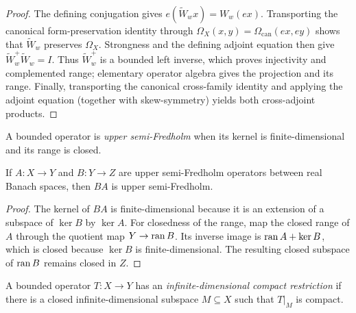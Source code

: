 \begin{proof}
The defining conjugation gives
$e(\widetilde W_wx)=W_w(ex)$.  Transporting the canonical form-preservation identity through
$\Omega_X(x,y)=\Omega_{\mathrm{can}}(ex,ey)$ shows that $\widetilde W_w$ preserves $\Omega_X$.
Strongness and the defining adjoint equation then give
$\widetilde W_w^+\widetilde W_w=I$.  Thus $\widetilde W_w^+$ is a bounded left inverse, which
proves injectivity and complemented range; elementary operator algebra gives the projection and
its range.  Finally, transporting the canonical cross-family identity and applying the adjoint
equation (together with skew-symmetry) yields both cross-adjoint products.
\end{proof}

\begin{definition}\label{def:upper-semi}
A bounded operator is \emph{upper semi-Fredholm} when its kernel is finite-dimensional and its
range is closed.
\leanok
\end{definition}

\begin{lemma}\label{lem:upper-semi-calculus}
If $A:X\to Y$ and $B:Y\to Z$ are upper semi-Fredholm operators between real Banach spaces, then
$BA$ is upper semi-Fredholm.
\leanok
\end{lemma}

\begin{proof}
The kernel of $BA$ is finite-dimensional because it is an extension of a subspace of
$\ker B$ by $\ker A$.  For closedness of the range, map the closed range of $A$ through the
quotient map $Y\to\operatorname{ran} B$.  Its inverse image is $\operatorname{ran} A+\ker B$, which is closed because
$\ker B$ is finite-dimensional.  The resulting closed subspace of $\operatorname{ran} B$ remains closed in
$Z$.
\end{proof}

\begin{definition}
\label{def:infinite-dimensional-compact-restriction}
A bounded operator $T:X\to Y$ has an \emph{infinite-dimensional compact restriction} if there
is a closed infinite-dimensional subspace $M\subseteq X$ such that $T|_M$ is compact.
\leanok
\end{definition}

